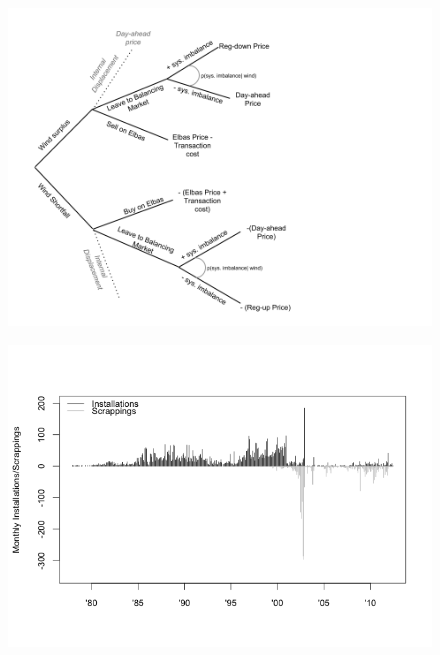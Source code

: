 \documentclass{beamer}
\begin{document}
\begin{frame}[plain]
	\begin{figure}
	\includegraphics[width=1\textwidth]{figures/DecisionTree.png}
	\end{figure}
\end{frame}

\begin{frame}[plain]
	\begin{figure}
	\includegraphics[width=1\textwidth]{figures/turbineInstallations.png}
	\end{figure}
\end{frame}
\end{document}
